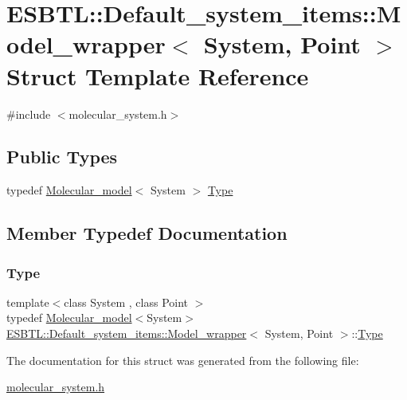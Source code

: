 \hypertarget{structESBTL_1_1Default__system__items_1_1Model__wrapper}{}\section{E\+S\+B\+TL\+:\+:Default\+\_\+system\+\_\+items\+:\+:Model\+\_\+wrapper$<$ System, Point $>$ Struct Template Reference}
\label{structESBTL_1_1Default__system__items_1_1Model__wrapper}


{\ttfamily \#include $<$molecular\+\_\+system.\+h$>$}

\subsection*{Public Types}
\begin{DoxyCompactItemize}
\item 
typedef \hyperlink{classESBTL_1_1Molecular__model}{Molecular\+\_\+model}$<$ System $>$ \hyperlink{structESBTL_1_1Default__system__items_1_1Model__wrapper_a00b684fbb88970776e2fb2495a3ee64c}{Type}
\end{DoxyCompactItemize}


\subsection{Member Typedef Documentation}
\mbox{\label{structESBTL_1_1Default__system__items_1_1Model__wrapper_a00b684fbb88970776e2fb2495a3ee64c}} 
\subsubsection{\texorpdfstring{Type}{Type}}
{\footnotesize\ttfamily template$<$class System , class Point $>$ \\
typedef \hyperlink{classESBTL_1_1Molecular__model}{Molecular\+\_\+model}$<$System$>$ \hyperlink{structESBTL_1_1Default__system__items_1_1Model__wrapper}{E\+S\+B\+T\+L\+::\+Default\+\_\+system\+\_\+items\+::\+Model\+\_\+wrapper}$<$ System, Point $>$\+::\hyperlink{structESBTL_1_1Default__system__items_1_1Model__wrapper_a00b684fbb88970776e2fb2495a3ee64c}{Type}}



The documentation for this struct was generated from the following file\+:\begin{DoxyCompactItemize}
\item 
\hyperlink{molecular__system_8h}{molecular\+\_\+system.\+h}\end{DoxyCompactItemize}
